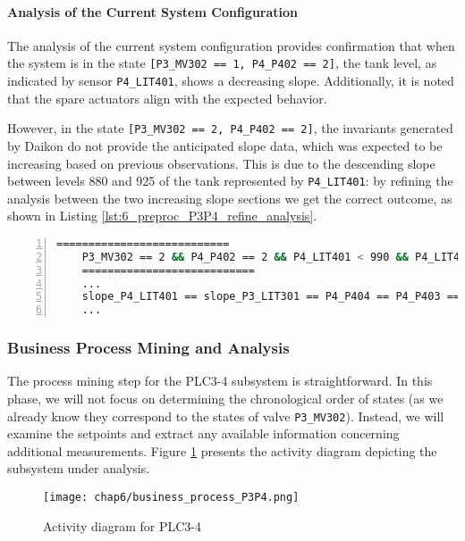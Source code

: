 \paragraph{Analysis of the Current System Configuration}
\label{par:6_P3P4_current_system_conf}
The analysis of the current system configuration provides confirmation that when the system is in the state \texttt{[P3\_MV302 == 1, P4\_P402 == 2]}, the tank level, as indicated by sensor \texttt{P4\_LIT401}, shows a decreasing slope. Additionally, it is noted that the spare actuators align with the expected behavior. 

However, in the state \texttt{[P3\_MV302 == 2, P4\_P402 == 2]}, the invariants generated by Daikon do not provide the anticipated slope data, which was expected to be increasing based on previous observations. This is due to the descending slope between levels 880 and 925 of the tank represented by \texttt{P4\_LIT401}: by refining the analysis between the two increasing slope sections we get the correct outcome, as shown in Listing \ref{lst:6_preproc_P3P4_refine_analysis}.

\begin{lstlisting}[language=bash, numbers=left, caption=Daikon manual analysis for \texttt{P3\_MV302 == 2}, label=lst:6_preproc_P3P4_refine_analysis]
	===========================
	P3_MV302 == 2 && P4_P402 == 2 && P4_LIT401 < 990 && P4_LIT401 > 930
	===========================
	...
	slope_P4_LIT401 == slope_P3_LIT301 == P4_P404 == P4_P403 == P4_P401 == P3_P301 == P3_MV304 == P3_MV303 == P3_MV301 == 1.0
	...
\end{lstlisting}

\subsubsection{Business Process Mining and Analysis}
\label{subsubsec:6_P3P4_bpa}

The process mining step for the PLC3-4 subsystem is straightforward. In this phase, we will not focus on determining the chronological order of states (as we already know they correspond to the states of valve \texttt{P3\_MV302}). Instead, we will examine the setpoints and extract any available information concerning additional measurements.
Figure \ref{fig:6_P3P4_process_mining} presents the activity diagram depicting the subsystem under analysis.

\begin{figure}[ht]
	\centering
	\texttt{[image: chap6/business\_process\_P3P4.png]}
	\caption{Activity diagram for PLC3-4}
	\label{fig:6_P3P4_process_mining}
\end{figure}

